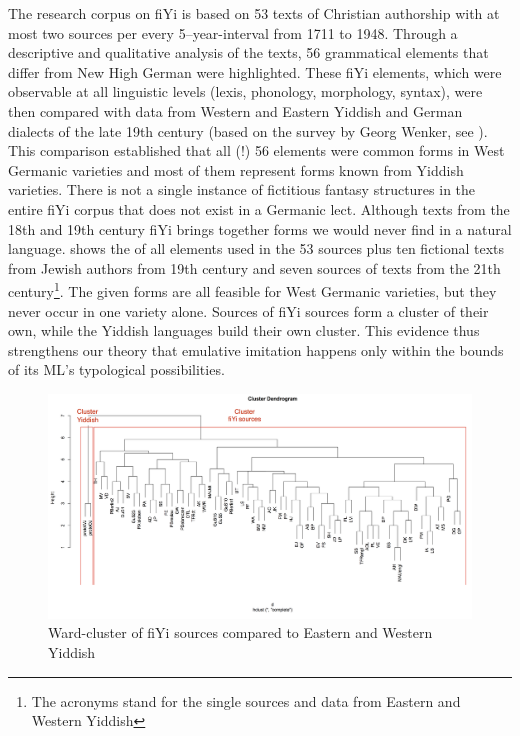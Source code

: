 \documentclass[output=paper]{LSP/langsci}
\begin{document}
The research corpus on fiYi is based on 53 texts of Christian authorship with at most two sources per every 5–year-interval from 1711 to 1948. Through a descriptive and qualitative analysis of the texts, 56 grammatical elements that differ from New High German were highlighted. These fiYi elements, which were observable at all linguistic levels (lexis, phonology, morphology, syntax), were then compared with data from Western and Eastern Yiddish and German dialects of the late 19th century (based on the survey by Georg Wenker, see \citealt{wenker_schriften_2013}).\\
This comparison established that all (!) 56 elements were common forms in West Germanic varieties and most of them represent forms known from Yiddish varieties. There is not a single instance of fictitious fantasy structures in the entire fiYi corpus that does not exist in a Germanic lect. Although texts from the 18th and 19th century fiYi brings together forms we would never find in a natural language.  shows the  of all elements used in the 53 sources plus ten fictional texts from Jewish authors from 19th century and seven sources of texts from the 21th century\footnote{The acronyms stand for the single sources %
and data from Eastern and Western Yiddish}. The given forms are all feasible for West Germanic varieties, but they never occur in one variety alone. Sources of fiYi sources form a cluster of their own, while the Yiddish languages build their own cluster. This evidence thus strengthens our theory that emulative imitation happens only within the bounds of its ML’s typological possibilities.
 
 \begin{figure}[h!]
\includegraphics[width=\textwidth]{illustrations/schaf_etal_fig5}%
		\caption{\label{RplotWJOJALLE} Ward-cluster of fiYi sources compared to Eastern and Western Yiddish}
	\end{figure}
\end{document}
